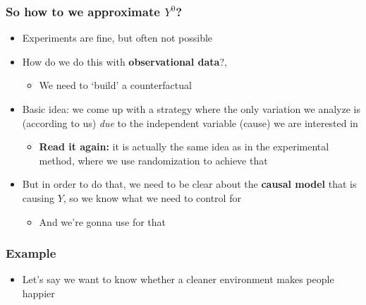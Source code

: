 \documentclass[aspectratio=43]{beamer}
\begin{document}
\begin{frame}
\frametitle{So how to we approximate $Y^{0}$?}
\centering

\begin{itemize}
  \item Experiments are fine, but often not possible
  \item<2-> How do we do this with \textbf{observational data}?,
    \begin{itemize}
      \item We need to `build' a counterfactual
    \end{itemize}
  \item<3-> Basic idea: we come up with a strategy where the only variation we analyze is (according to us) \textit{due} to the independent variable (cause) we are interested in
  \begin{itemize}
    \item \textbf{Read it again:} it is actually the same idea as in the experimental method, where we use randomization to achieve that
  \end{itemize}
  \item<4-> But in order to do that, we need to be clear about the \textbf{causal model} that is causing $Y$, so we know what we need to control for
  \begin{itemize}
    \item And we're gonna use  for that
  \end{itemize}
\end{itemize}

\end{frame}


\begin{frame}
\frametitle{Example}
\centering

\begin{itemize}
\item Let's say we want to know whether a cleaner environment makes people happier
\end{itemize}

\end{frame}
\end{document}
